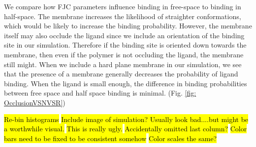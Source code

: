 \documentclass[../../AdvancementSummary.tex]{subfiles}
\begin{document}
We compare how FJC parameters influence binding in free-space to binding in half-space. The membrane increases the likelihood of straighter conformations, which would be likely to increase the binding probability. However, the membrane itself may also occlude the ligand since we include an orientation of the binding site in our simulation. Therefore if the binding site is oriented down towards the membrane, then even if the polymer is not occluding the ligand, the membrane still might. When we include a hard plane membrane in our simulation, we see that the presence of a membrane generally decreases the probability of ligand binding.  When the ligand is small enough, the difference in binding probabilities between free space and half space binding is minimal. (Fig. \ref{fig: OcclusionVSNVSR})

\hl{Re-bin histograms} \hl{Include image of simulation?  Usually look bad....but might be a worthwhile visual.}
\hl{This is really ugly.}
\hl{Accidentally omitted last column?}
\hl{Color bars need to be fixed to be consistent somehow}
\hl{Color scales the same?}
\end{document}

